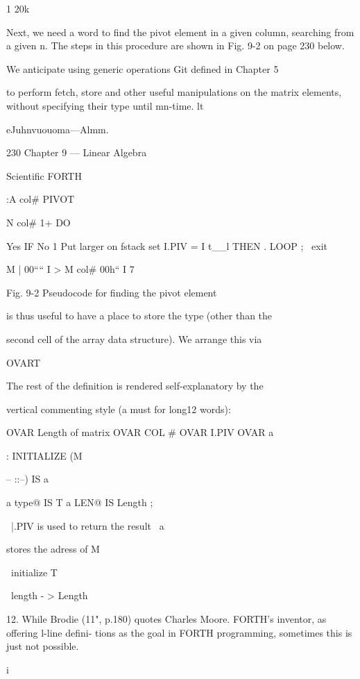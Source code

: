 {{{{{{{{{{{{{1
20k

Next, we need a word to ﬁnd the pivot element in a given
column, searching from a given n. The steps in this procedure
are shown in Fig. 9-2 on page 230 below.

We anticipate using generic operations Git deﬁned in Chapter 5

to perform fetch, store and other useful manipulations on the
matrix elements, without specifying their type until mn-time. lt

eJuhnvuouoma—Almm.

230 Chapter 9 — Linear Algebra

Scientific FORTH

 

:A{{ col# }}PIVOT

N col# 1+ DO

 

Yes IF
No 1 Put larger on fstack
set I.PIV = I
t__l THEN
. LOOP
; \ exit

 

 

M{{ | }{ 00““ }}I > M{{ col# }{ 00h“ }}I 7

 

 

 

 

Fig. 9-2 Pseudocode for finding the pivot element

is thus useful to have a place to store the type (other than the

second cell of the array data structure). We arrange this via

OVART

The rest of the deﬁnition is rendered self-explanatory by the

vertical commenting style (a must for long12 words):

OVAR Length \Iength of matrix
OVAR COL \currentcol#
OVAR I.PIV
OVAR a{{
: INITIALIZE (M{{ -- ::--)
IS a{{
a type@ IS T
a LEN@ IS Length ;

\ |.PIV is used to return the result
\ a{{ stores the adress of M{{

\ initialize T

\ length - > Length

 

12. While Brodie (11", p.180) quotes Charles Moore. FORTH's inventor, as offering l-line deﬁni-
tions as the goal in FORTH programming, sometimes this is just not possible.

i

}}}}}}}}}}}}}}}}}}}}}}}
